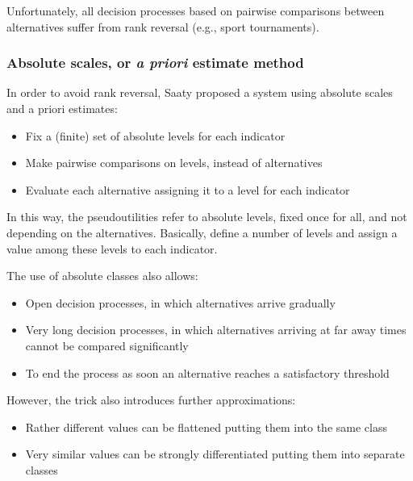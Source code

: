 Unfortunately, all decision processes based on pairwise comparisons between alternatives suffer from rank reversal (e.g., sport tournaments).

\subsubsection{Absolute scales, or \textit{a priori} estimate method}

In order to avoid rank reversal, Saaty proposed a system using absolute scales and a priori estimates: 
\begin{itemize}
	\item Fix a (finite) set of absolute levels for each indicator
	
	\item Make pairwise comparisons on levels, instead of alternatives 
	
	\item Evaluate each alternative assigning it to a level for each indicator
\end{itemize}

In this way, the pseudoutilities refer to absolute levels, fixed once for all, and not depending on the alternatives. Basically, define a number of levels and assign a value among these levels to each indicator.

The use of absolute classes also allows:
\begin{itemize}
	\item Open decision processes, in which alternatives arrive gradually
	
	\item Very long decision processes, in which alternatives arriving at far away times cannot be compared significantly
	
	\item To end the process as soon an alternative reaches a satisfactory threshold 
\end{itemize}

However, the trick also introduces further approximations:
\begin{itemize}
	\item Rather different values can be flattened putting them into the same class 
	
	\item Very similar values can be strongly differentiated putting them into separate classes
\end{itemize}


